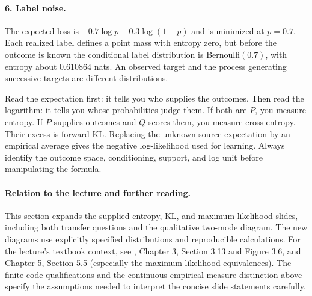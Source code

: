 \paragraph{6. Label noise.}
The expected loss is $-0.7\log p-0.3\log(1-p)$ and is minimized at $p=0.7$.
Each realized label defines a point mass with entropy zero, but before the
outcome is known the conditional label distribution is Bernoulli$(0.7)$, with
entropy about $0.610864$ nats. An observed target and the process generating
successive targets are different distributions.

\begin{keyidea}
Read the expectation first: it tells you who supplies the outcomes. Then read
the logarithm: it tells you whose probabilities judge them. If both are $P$,
you measure entropy. If $P$ supplies outcomes and $Q$ scores them, you measure
cross-entropy. Their excess is forward KL. Replacing the unknown source
expectation by an empirical average gives the negative log-likelihood used for
learning. Always identify the outcome space, conditioning, support, and log unit
before manipulating the formula.
\end{keyidea}

\paragraph{Relation to the lecture and further reading.}
This section expands the supplied entropy, KL, and maximum-likelihood slides,
including both transfer questions and the qualitative two-mode diagram. The
new diagrams use explicitly specified distributions and reproducible calculations.
For the lecture's textbook context, see \citet{goodfellow2016deep}, Chapter 3,
Section 3.13 and Figure 3.6, and Chapter 5, Section 5.5 (especially the
maximum-likelihood equivalences). The finite-code qualifications and the
continuous empirical-measure distinction above specify the assumptions needed
to interpret the concise slide statements carefully.
